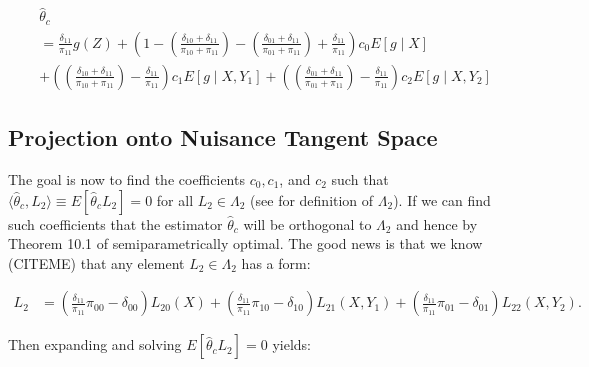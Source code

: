 \documentclass[12pt]{article}
\begin{document}
\begin{align}
  &\hat \theta_c \\ \nonumber
  &= \frac{\delta_{11}}{\pi_{11}} g(Z) + \left(1 -
    \left(\frac{\delta_{10} + \delta_{11}}{\pi_{10} + \pi_{11}}\right) -
    \left(\frac{\delta_{01} + \delta_{11}}{\pi_{01} + \pi_{11}}\right) + 
  \frac{\delta_{11}}{\pi_{11}}\right) c_0 E[g \mid X] \\ \nonumber
  &+
  \left(\left(\frac{\delta_{10} + \delta_{11}}{\pi_{10} + \pi_{11}}\right) - 
  \frac{\delta_{11}}{\pi_{11}}\right) c_1 E[g \mid X, Y_1] +
  \left(\left(\frac{\delta_{01} + \delta_{11}}{\pi_{01} + \pi_{11}}\right) - 
  \frac{\delta_{11}}{\pi_{11}}\right) c_2 E[g \mid X, Y_2]
\end{align}

\subsection*{Projection onto Nuisance Tangent Space}

The goal is now to find the coefficients $c_0, c_1$, and $c_2$ such that 
$\langle \hat \theta_c, L_2\rangle \equiv E[\hat \theta_c L_2] = 0$ for 
all $L_2 \in \Lambda_2$ (see \cite{tsiatis2006semiparametric} for definition 
of $\Lambda_2$). If we can find such coefficients that the estimator $\hat
\theta_c$ will be orthogonal to $\Lambda_2$ and hence by Theorem 10.1 of 
\cite{tsiatis2006semiparametric} semiparametrically optimal. The good news 
is that we know (CITEME) that any element $L_2 \in \Lambda_2$ has a form:

\begin{align}
  L_2 &= 
  \left(\frac{\delta_{11}}{\pi_{11}}\pi_{00} - \delta_{00}\right) L_{20}(X) +
  \left(\frac{\delta_{11}}{\pi_{11}}\pi_{10} - \delta_{10}\right) L_{21}(X, Y_1) +
  \left(\frac{\delta_{11}}{\pi_{11}}\pi_{01} - \delta_{01}\right) L_{22}(X, Y_2).
\end{align}

Then expanding and solving $E[\hat \theta_c L_2] = 0$ yields:
\end{document}
